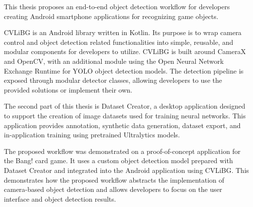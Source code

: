 This thesis proposes an end-to-end object detection workflow for developers creating Android smartphone applications for recognizing game objects. 

CVLiBG is an Android library written in Kotlin. Its purpose is to wrap camera control and object detection related functionalities into simple, reusable, and modular components for developers to utilize. CVLiBG is built around CameraX and OpenCV, with an additional module using the Open Neural Network Exchange Runtime for YOLO object detection models. The detection pipeline is exposed through modular detector classes, allowing developers to use the provided solutions or implement their own.

The second part of this thesis is Dataset Creator, a desktop application designed to support the creation of image datasets used for training neural networks. This application provides annotation, synthetic data generation, dataset export, and in-application training using pretrained Ultralytics models.

The proposed workflow was demonstrated on a proof-of-concept application for the Bang! card game. It uses a custom object detection model prepared with Dataset Creator and integrated into the Android application using CVLiBG. This demonstrates how the proposed workflow abstracts the implementation of camera-based object detection and allows developers to focus on the user interface and object detection results.